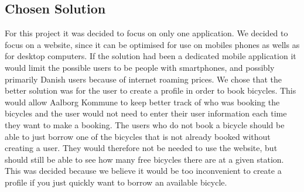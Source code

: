 \subsection{Chosen Solution}
For this project it was decided to focus on only one application.
We decided to focus on a website, since it can be optimised for use on mobiles phones as wells as for desktop computers. 
If the solution had been a dedicated mobile application it would limit the possible users to be people with smartphones, and possibly primarily Danish users because of internet roaming prices.
We chose that the better solution was for the user to create a profile in order to book bicycles. 
This would allow Aalborg Kommune to keep better track of who was booking the bicycles and the user would not need to enter their user information each time they want to make a booking.
The users who do not book a bicycle should be able to just borrow one of the bicycles that is not already booked without creating a user.
They would therefore not be needed to use the website, but should still be able to see how many free bicycles there are at a given station.
This was decided because we believe it would be too inconvenient to create a profile if you just quickly want to borrow an available bicycle.